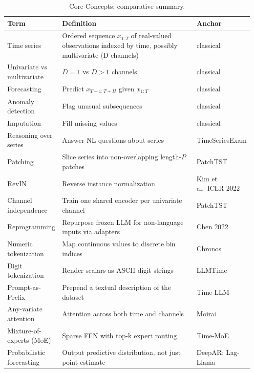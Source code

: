 \documentclass{article}
\begin{document}
\begin{table}[t]
\centering
\caption{Core Concepts: comparative summary.}
\label{tab:core-concepts}
\begin{tabular}{>{\raggedright\arraybackslash}p{0.1656\linewidth}
  >{\raggedright\arraybackslash}p{0.6752\linewidth}
  >{\raggedright\arraybackslash}p{0.1592\linewidth}}
\toprule
Term & Definition & Anchor \\
\midrule
Time series & Ordered sequence \(x_{1:T}\) of real-valued observations indexed by time, possibly multivariate (D channels) & classical \\
Univariate vs multivariate & \(D=1\) vs \(D>1\) channels & classical \\
Forecasting & Predict \(x_{T+1:T+H}\) given \(x_{1:T}\) & classical \\
Anomaly detection & Flag unusual subsequences & classical \\
Imputation & Fill missing values & classical \\
Reasoning over series & Answer NL questions about series & TimeSeriesExam \cite{cai2024timeseriesexamatim} \\
Patching & Slice series into non-overlapping length-\(P\) patches & PatchTST \cite{nie2023atimeseriesisworth} \\
RevIN & Reverse instance normalization & Kim et al.~ICLR 2022 \\
Channel independence & Train one shared encoder per univariate channel & PatchTST \cite{nie2023atimeseriesisworth} \\
Reprogramming & Repurpose frozen LLM for non-language inputs via adapters & Chen 2022 \\
Numeric tokenization & Map continuous values to discrete bin indices & Chronos \cite{ansari20242024} \\
Digit tokenization & Render scalars as ASCII digit strings & LLMTime \cite{gruver2023largelanguagemodel} \\
Prompt-as-Prefix & Prepend a textual description of the dataset & Time-LLM \cite{jin2024timellmtimeseriesf} \\
Any-variate attention & Attention across both time and channels & Moirai \cite{woo2024unifiedtrainingofu} \\
Mixture-of-experts (MoE) & Sparse FFN with top-k expert routing & Time-MoE \cite{shi2024timemoebillionscal} \\
Probabilistic forecasting & Output predictive distribution, not just point estimate & DeepAR; Lag-Llama \\

\end{tabular}
\end{table}
\end{document}
